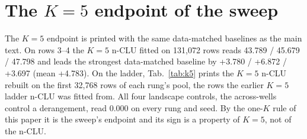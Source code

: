 \documentclass{article} %
\begin{document}
\section{The $K=5$ endpoint of the sweep}
\label{app:k5}
The $K=5$ endpoint is printed with the same data-matched baselines as the main text. On rows 3--4 the
$K=5$ n-CLU fitted on 131,072 rows reads 43.789 / 45.679 / 47.798 and leads the strongest data-matched %
baseline by +3.780 / +6.872 / +3.697 (mean +4.783). On the ladder, Tab.~\ref{tab:k5} prints the $K=5$ %
n-CLU rebuilt on the first 32,768 rows of each rung's pool, the rows the earlier $K=5$ ladder n-CLU %
was fitted from. All four landscape controls, the across-wells control a derangement, read 0.000 on
every rung and seed. By the one-$K$ rule of this paper it is the sweep's endpoint and its sign is a %
property of $K=5$, not of the n-CLU.
\end{document}
